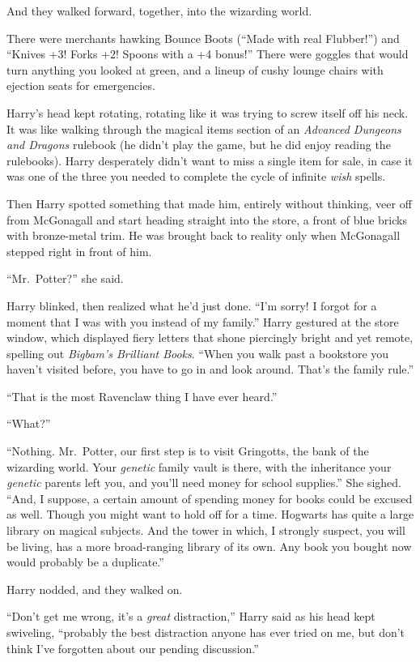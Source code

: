 And they walked forward, together, into the wizarding world.

There were merchants hawking Bounce Boots (“Made with real Flubber!”) and “Knives +3! Forks +2! Spoons with a +4 bonus!” There were goggles that would turn anything you looked at green, and a lineup of cushy lounge chairs with ejection seats for emergencies.

Harry’s head kept rotating, rotating like it was trying to screw itself off his neck. It was like walking through the magical items section of an \emph{Advanced Dungeons and Dragons} rulebook (he didn’t play the game, but he did enjoy reading the rulebooks). Harry desperately didn’t want to miss a single item for sale, in case it was one of the three you needed to complete the cycle of infinite \emph{wish} spells.

Then Harry spotted something that made him, entirely without thinking, veer off from McGonagall and start heading straight into the store, a front of blue bricks with bronze-metal trim. He was brought back to reality only when McGonagall stepped right in front of him.

“Mr.~Potter?” she said.

Harry blinked, then realized what he’d just done. “I’m sorry! I forgot for a moment that I was with you instead of my family.” Harry gestured at the store window, which displayed fiery letters that shone piercingly bright and yet remote, spelling out \emph{Bigbam’s Brilliant Books}. “When you walk past a bookstore you haven’t visited before, you have to go in and look around. That’s the family rule.”

“That is the most Ravenclaw thing I have ever heard.”

“What?”

“Nothing. Mr.~Potter, our first step is to visit Gringotts, the bank of the wizarding world. Your \emph{genetic} family vault is there, with the inheritance your \emph{genetic} parents left you, and you’ll need money for school supplies.” She sighed. “And, I suppose, a certain amount of spending money for books could be excused as well. Though you might want to hold off for a time. Hogwarts has quite a large library on magical subjects. And the tower in which, I strongly suspect, you will be living, has a more broad-ranging library of its own. Any book you bought now would probably be a duplicate.”

Harry nodded, and they walked on.

“Don’t get me wrong, it’s a \emph{great} distraction,” Harry said as his head kept swiveling, “probably the best distraction anyone has ever tried on me, but don’t think I’ve forgotten about our pending discussion.”

